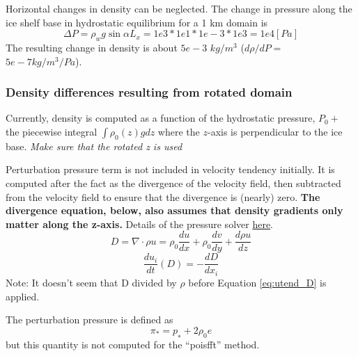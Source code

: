 	Horizontal changes in density can be neglected. The change in pressure along the ice shelf base in hydrostatic equilibrium for a 1 km domain is
	\begin{equation}
	    \Delta P = \rho_w g \sin \alpha L_x = 1e3 * 1e1 * 1e-3 * 1e3 = 1e4 [Pa]
	\end{equation}
	The resulting change in density is about $5e-3$ $kg/m^3$ ($d\rho/dP =$ $5e-7 kg/m^3/Pa$).
	
	\subsubsection{Density differences resulting from rotated domain}
	Currently, density is computed as a function of the hydrostatic pressure, $P_0 + $ the piecewise integral $\int \rho_0(z) g dz$ where the $z$-axis is perpendicular to the ice base. \textit{Make sure that the rotated z is used}

	Perturbation pressure term is not included in velocity tendency initially. It is computed after the fact as the divergence of the velocity field, then subtracted from the velocity field to ensure that the divergence is (nearly) zero. \textbf{The divergence equation, below, also assumes that density gradients only matter along the z-axis.} Details of the pressure solver \href{https://palm.muk.uni-hannover.de/trac/wiki/doc/tec/pres}{here}.
    \begin{equation}
         D = \nabla \cdot \rho u = \rho_0\frac{du}{dx} + \rho_0\frac{dv}{dy} + \frac{d\rho u}{dz}
    \end{equation}
    \begin{equation}\label{eq:utend_D}
        \frac{du_i}{dt}(D) = -\frac{dD}{dx_i}  
    \end{equation}
    Note: It doesn't seem that D divided by $\rho$ before Equation \ref{eq:utend_D} is applied.
    
	The perturbation pressure is defined as
	\begin{equation}
	    \pi_* = p_∗ + 2 \rho_0 e
	\end{equation}
	but this quantity is not computed for the ``poisfft'' method.
